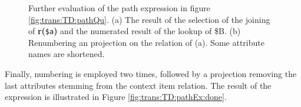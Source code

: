 \begin{myExample}
\begin{figure}[h]
\centering
{}
\quad
{}
\caption[Further evaluation of the path expression]{Further evaluation of the path expression in figure
\ref{fig:trans:TD:pathQu}. (a) The result of the selection of the joining of \textbf{r(}\texttt{\$a}\textbf{)} and
the numerated result of the lookup of \textsf{\$B}. (b) Renumbering an projection on the relation of (a). Some
attribute names are shortened.}
\end{figure}

Finally, numbering is employed two times, followed by a projection removing the last attributes stemming from the
context item relation. The result of the expression is illustrated in Figure \ref{fig:trans:TD:pathEx:done}.

\end{myExample}

